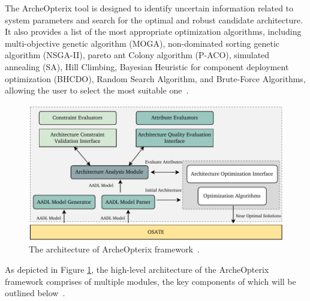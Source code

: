 The ArcheOpterix tool is designed to identify uncertain information related to system parameters and search for the optimal and robust candidate architecture. It also provides a list of the most appropriate optimization algorithms, including multi-objective genetic algorithm (MOGA), non-dominated sorting genetic algorithm (NSGA-II), pareto ant Colony algorithm (P-ACO), simulated annealing (SA), Hill Climbing, Bayesian Heuristic for component deployment optimization (BHCDO), Random Search Algorithm, and Brute-Force Algorithms, allowing the user to select the most suitable one~\cite{meedeniya2011reliability}.
\begin{figure}[t]
\centering
\includegraphics[width=\textwidth]{figures/Archeopterix_new.pdf}
\caption{The architecture of ArcheOpterix framework~\cite{askaripoor2023designer}.}
\label{fig046}
\end{figure}
As depicted in Figure \ref{fig046}, the high-level architecture of the ArcheOpterix framework comprises of multiple modules, the key components of which will be outlined below~\cite{meedeniya2011reliability}.


